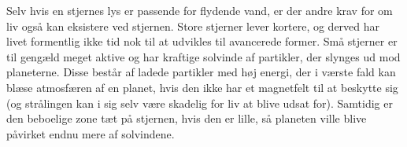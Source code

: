 Selv hvis en stjernes lys er passende for flydende vand, er der andre krav for om liv også kan eksistere ved stjernen. Store stjerner lever kortere, og derved har livet formentlig ikke tid nok til at udvikles til avancerede former. Små stjerner er til gengæld meget aktive og har kraftige solvinde af partikler, der slynges ud mod planeterne. Disse består af ladede partikler med høj energi, der i værste fald kan blæse atmosfæren af en planet, hvis den ikke har et magnetfelt til at beskytte sig (og strålingen kan i sig selv være skadelig for liv at blive udsat for). Samtidig er den beboelige zone tæt på stjernen, hvis den er lille, så planeten ville blive påvirket endnu mere af solvindene. \\

